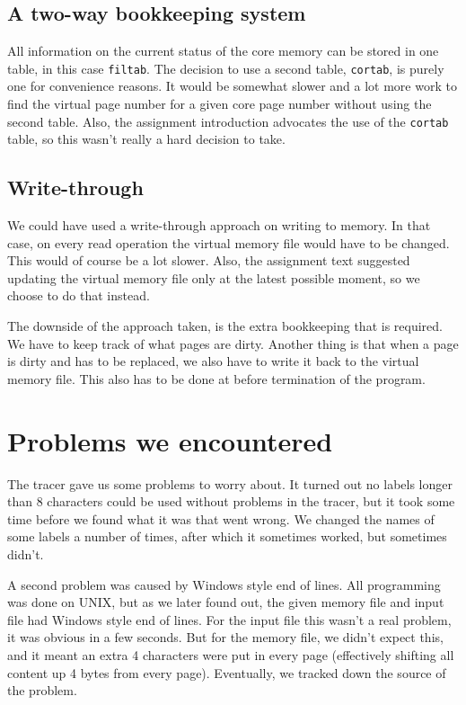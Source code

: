 \documentclass[11pt]{article}
\begin{document}
\subsection{A two-way bookkeeping system}

All information on the current status of the core memory can be stored in one table, in this case \verb|filtab|. The decision to use a second table, \verb|cortab|, is purely one for convenience reasons. It would be somewhat slower and a lot more work to find the virtual page number for a given core page number without using the second table. Also, the assignment introduction advocates the use of the \verb|cortab| table, so this wasn't really a hard decision to take.

\subsection{Write-through}

We could have used a write-through approach on writing to memory. In that case, on every read operation the virtual memory file would have to be changed. This would of course be a lot slower. Also, the assignment text suggested updating the virtual memory file only at the latest possible moment, so we choose to do that instead.

The downside of the approach taken, is the extra bookkeeping that is required. We have to keep track of what pages are dirty. Another thing is that when a page is dirty and has to be replaced, we also have to write it back to the virtual memory file. This also has to be done at before termination of the program.


\section{Problems we encountered}

The tracer gave us some problems to worry about. It turned out no labels longer than 8 characters could be used without problems in the tracer, but it took some time before we found what it was that went wrong. We changed the names of some labels a number of times, after which it sometimes worked, but sometimes didn't.

A second problem was caused by Windows style end of lines. All programming was done on UNIX, but as we later found out, the given memory file and input file had Windows style end of lines. For the input file this wasn't a real problem, it was obvious in a few seconds. But for the memory file, we didn't expect this, and it meant an extra 4 characters were put in every page (effectively shifting all content up 4 bytes from every page). Eventually, we tracked down the source of the problem.
\end{document}
